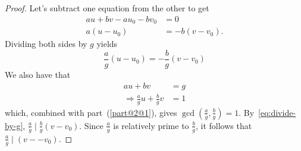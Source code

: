 \documentclass[
  coursecode={MTHE 418},
  assignmentname={Homework \homeworknumber},
  studentnumber=20053722,
  name={Bryan Hoang},
  draft,
]{
  ltxanswer%
}
\begin{document}
\begin{questions}
\begin{parts}
      \part{}
      \begin{solution}

      \end{solution}

      \part{}
      \begin{solution}
        \begin{proof}
          Let's subtract one equation from the other to get
          \begin{align*}
            au + bv - au_{0} - bv_{0} &= 0              \\
            a(u - u_{0})              &= -b(v - v_{0}).
          \end{align*}
          Dividing both sides by \(g\) yields
          \begin{equation}\label{eq:divide-by-g}
            \frac{a}{g}(u - u_{0}) = -\frac{b}{g}(v - v_{0})
          \end{equation}
          We also have that
          \begin{align*}
            au + bv                                 &= g \\
            \Rightarrow \frac{a}{g}u + \frac{b}{g}v &= 1
          \end{align*}
          which, combined with part~(\ref{part@2@1}), gives \(\gcd(\frac{a}{g}, \frac{b}{g}) = 1\). By~\eqref{eq:divide-by-g}, \(\frac{a}{g} \mid \frac{b}{g}(v - v_{0})\). Since \(\frac{a}{g}\) is relatively prime to  \(\frac{b}{g}\), it follows that \(\frac{a}{g} \mid (v - -v_{0})\).
        \end{proof}
      \end{solution}
    \end{parts}

    \question{}
    \begin{solution}

    \end{solution}

    \question{}
    \begin{solution}

    \end{solution}

    \question{}
    \begin{solution}


\end{solution}
\end{questions}
\end{document}
